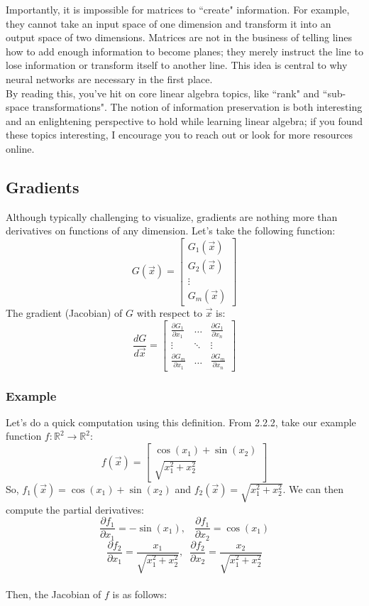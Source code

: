 \documentclass{article}
\begin{document}
Importantly, it is impossible for matrices to ``create" information. For example, they cannot take an input space of one dimension and transform it into an output space of two dimensions. Matrices are not in the business of telling lines how to add enough information to become planes; they merely instruct the line to lose information or transform itself to another line. This idea is central to why neural networks are necessary in the first place. \\

By reading this, you've hit on core linear algebra topics, like ``rank" and ``sub-space transformations". The notion of information preservation is both interesting and an enlightening perspective to hold while learning linear algebra; if you found these topics interesting, I encourage you to reach out or look for more resources online.

\subsection{Gradients}

Although typically challenging to visualize, gradients are nothing more than derivatives on functions of any dimension. Let's take the following function:
\[G\left(\vec{x}\right) = \begin{bmatrix} G_{1}\left(\vec{x}\right) \\ G_{2}\left(\vec{x}\right) \\ \vdots \\ G_{m}\left(\vec{x}\right)\end{bmatrix}\]
The gradient (Jacobian) of $G$ with respect to $\vec{x}$ is:
\[\frac{dG}{d\vec{x}} = \begin{bmatrix}
\frac{\partial G_1}{\partial x_1} & \hdots & \frac{\partial G_1}{\partial x_n} \\
\vdots & \ddots & \vdots \\
\frac{\partial G_m}{\partial x_1} & \hdots & \frac{\partial G_m}{\partial x_n}
\end{bmatrix}
\]
\subsubsection{Example}
Let's do a quick computation using this definition. From 2.2.2, take our example function $f: \mathbb{R}^2 \to \mathbb{R}^2$:
\[f\left(\vec{x}\right) = \begin{bmatrix} \cos(x_1) + \sin (x_2) \\ \sqrt{x_1^2 + x_2^2}\end{bmatrix}\]
So, $f_1\left(\vec{x}\right) = \cos(x_1) + \sin (x_2)$ and $f_2\left(\vec{x}\right) = \sqrt{x_1^2 + x_2^2}$. We can then compute the partial derivatives: \\
\[\frac{\partial f_1}{\partial x_1} = -\sin(x_1), \;\;\;\frac{\partial f_1}{\partial x_2} = \cos(x_1)\]
\[\frac{\partial f_2}{\partial x_1} = \frac{x_1}{\sqrt{x_1^2 + x_2^2}}, \;\; \frac{\partial f_2}{\partial x_2} = \frac{x_2}{\sqrt{x_1^2 + x_2^2}}\]\\
Then, the Jacobian of $f$ is as follows:
\end{document}
